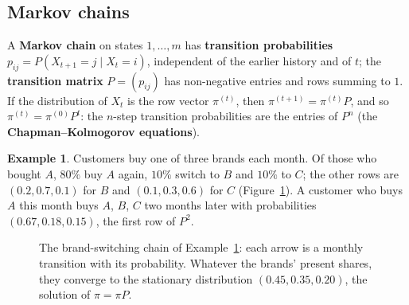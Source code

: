 \documentclass[11pt,a4paper]{article}
\numberwithin{equation}{section}
\theoremstyle{definition}
\newtheorem{exa}[thm]{Example}
\begin{document}
\subsection{Markov chains}
\label{ssec:chains}

A \textbf{Markov chain} on states $1, \ldots, m$ has \textbf{transition probabilities} $p_{ij} = P(X_{t + 1} = j \mid X_t = i)$, independent of the earlier history and of $t$; the \textbf{transition matrix} $P = (p_{ij})$ has non-negative entries and rows summing to $1$. If the distribution of $X_t$ is the row vector $\pi^{(t)}$, then
$\pi^{(t + 1)} = \pi^{(t)}P$, and so $\pi^{(t)} = \pi^{(0)}P^t$: the $n$-step transition probabilities are the entries of $P^n$ (the \textbf{Chapman--Kolmogorov equations}).

\begin{exa}
\label{ex:brands}
Customers buy one of three brands each month. Of those who bought $A$, $80\%$ buy $A$ again, $10\%$ switch to $B$ and $10\%$ to $C$; the other rows are $(0.2, 0.7, 0.1)$ for $B$ and $(0.1, 0.3, 0.6)$ for $C$ (Figure~\ref{fig:brands}). A customer who buys $A$ this month buys $A$, $B$, $C$ two months later with
probabilities $(0.67, 0.18, 0.15)$, the first row of $P^2$.
\end{exa}

\begin{figure}[H]
\centering
{}
\caption{The brand-switching chain of Example~\ref{ex:brands}: each arrow is a monthly transition with its probability. Whatever the brands' present shares, they converge to the stationary distribution $(0.45, 0.35, 0.20)$, the solution of $\pi = \pi P$.}
\label{fig:brands}
\end{figure}
\end{document}
